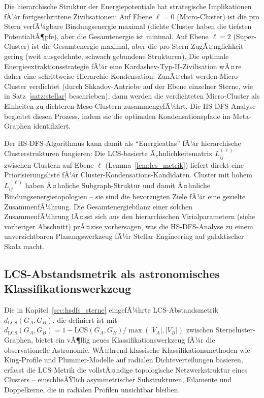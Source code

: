 ﻿\documentclass[a4paper,12pt]{report}
\theoremstyle{definition}
\begin{document}
Die hierarchische Struktur der Energiepotentiale hat strategische Implikationen fÃ¼r fortgeschrittene Zivilisationen: Auf Ebene $\ell = 0$ (Micro-Cluster) ist die pro Stern verfÃ¼gbare Bindungsenergie maximal (dichte Cluster haben die tiefsten PotentialtÃ¶pfe), aber die Gesamtenergie ist minimal. Auf Ebene $\ell = 2$ (Super-Cluster) ist die Gesamtenergie maximal, aber die pro-Stern-ZugÃ¤nglichkeit gering (weit ausgedehnte, schwach gebundene Strukturen). Die optimale Energieextraktionsstrategie fÃ¼r eine Kardashev-Typ-II-Zivilisation wÃ¤re daher eine schrittweise Hierarchie-Kondensation: ZunÃ¤chst werden Micro-Cluster verdichtet (durch Shkadov-Antriebe auf der Ebene einzelner Sterne, wie in Satz~\ref{satz:stellar} beschrieben), dann werden die verdichteten Micro-Cluster als Einheiten zu dichteren Meso-Clustern zusammengefÃ¼hrt. Die HS-DFS-Analyse begleitet diesen Prozess, indem sie die optimalen Kondensationspfade im Meta-Graphen identifiziert.

Der HS-DFS-Algorithmus kann damit als ``Energieatlas'' fÃ¼r hierarchische Clusterstrukturen fungieren: Die LCS-basierte Ã„hnlichkeitsmatrix $L^{(\ell)}_{ij}$ zwischen Clustern auf Ebene $\ell$ (Lemma~\ref{lem:lcs_metrik}) liefert direkt eine Priorisierungsliste fÃ¼r Cluster-Kondensations-Kandidaten. Cluster mit hohem $L^{(\ell)}_{ij}$ haben Ã¤hnliche Subgraph-Struktur und damit Ã¤hnliche Bindungsenergietopologien -- sie sind die bevorzugten Ziele fÃ¼r eine gezielte ZusammenfÃ¼hrung. Die Gesamtenergiebilanz einer solchen ZusammenfÃ¼hrung lÃ¤sst sich aus den hierarchischen Virialparametern (siehe vorheriger Abschnitt) prÃ¤zise vorhersagen, was die HS-DFS-Analyse zu einem unverzichtbaren Planungswerkzeug fÃ¼r Stellar Engineering auf galaktischer Skala macht.

\subsection{LCS-Abstandsmetrik als astronomisches Klassifikationswerkzeug}

Die in Kapitel~\ref{sec:hsdfs_sterne} eingefÃ¼hrte LCS-Abstandsmetrik $d_\mathrm{LCS}(G_A, G_B)$, die definiert ist mit $d_\mathrm{LCS}(G_A, G_B) = 1 - \mathrm{LCS}(G_A, G_B) / \max(|V_A|, |V_B|)$ zwischen Sterncluster-Graphen, bietet ein vÃ¶llig neues Klassifikationswerkzeug fÃ¼r die observationelle Astronomie. WÃ¤hrend klassische Klassifikationsmethoden wie King-Profile \cite{king1966} und Plummer-Modelle \cite{plummer1911} auf radialen Dichteverteilungen basieren, erfasst die LCS-Metrik die vollstÃ¤ndige topologische Netzwerkstruktur eines Clusters -- einschlieÃŸlich asymmetrischer Substrukturen, Filamente und Doppelkerne, die in radialen Profilen unsichtbar bleiben.
\end{document}
